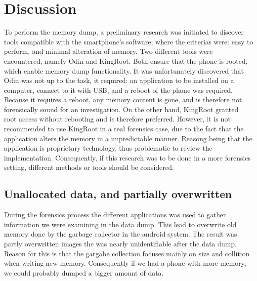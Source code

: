 \section{Discussion}
To perform the memory dump, a preliminary research was initiated to discover tools compatible with the smartphone's software; where the criterias were: easy to perform, and minimal alteration of memory. Two different tools were encountered, namely Odin and KingRoot. Both ensure that the phone is rooted, which enable memory dump functionality.
It was unfortunately discovered that Odin was not up to the task, it required: an application to be installed on a computer, connect to it with USB, and a reboot of the phone was required. Because it requires a reboot, any memory content is gone, and is therefore not forensically sound for an investigation. On the other hand, KingRoot granted root access without rebooting and is therefore preferred. However, it is not recommended to use KingRoot in a real forensics case, due to the fact that the application alters the memory in a unpredictable manner. Reasong being that the application is proprietary technology, thus problematic to review the implementation. Consequently, if this research was to be done in a more forensics setting, different methods or tools should be considered. 
\subsection{Unallocated data, and partially overwritten}
During the forensics process the different applications was used to gather information we were examining in the data dump. This lead to overwrite old memory done by the garbage collector in the android system. The result was partly overwritten images the was nearly unidentifiable after the data dump. Reason for this is that the gargabe collection focuses mainly on size and collition when writing new memory. Consequently if we had a phone with more memory, we could probably dumped a bigger amount of data.

